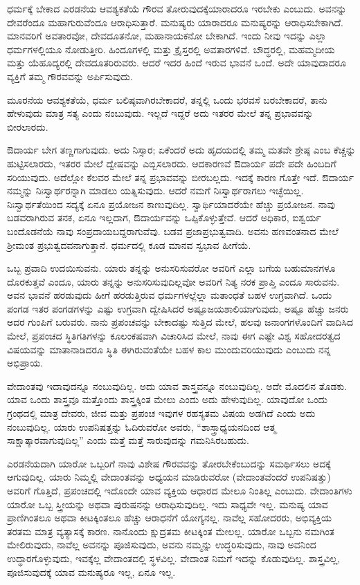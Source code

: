 ಧರ್ಮಕ್ಕೆ ಬೇಕಾದ ಎರಡನೆಯ ಆವಶ್ಯಕತೆಯೆ ಗೌರವ ತೋರುವುದಕ್ಕೆ\break ಯಾರಾದರೂ ಇರಬೇಕು ಎಂಬುದು. ಅವನನ್ನು ದೇವರೆಂದೂ ಮಹಾಗುರುವೆಂದೂ ಆರಾಧಿಸುತ್ತಾರೆ. ಮನುಷ್ಯರು ಯಾರಾದರೂ ಮನುಷ್ಯರನ್ನು ಆರಾಧಿಸಬೇಕಾಗಿದೆ. ಮಾನವರಿಗೆ ಅವತಾರವೋ, ದೇವದೂತನೋ, ಮಹಾನಾಯಕನೋ ಬೇಕಾಗಿದೆ. ಇಂದು ನೀವು ಇದನ್ನು ಎಲ್ಲಾ ಧರ್ಮಗಳಲ್ಲಿಯೂ ನೋಡುತ್ತೀರಿ. ಹಿಂದೂಗಳಲ್ಲಿ ಮತ್ತು ಕ್ರೈಸ್ತರಲ್ಲಿ ಅವತಾರಗಳಿವೆ. ಬೌದ್ಧರಲ್ಲಿ, ಮಹಮ್ಮದೀಯ ಮತ್ತು ಯೆಹೂದ್ಯರಲ್ಲಿ ದೇವದೂತರಿರುವರು. ಆದರೆ ಇದರ ಹಿಂದೆ ಇರುವ ಭಾವನೆ ಒಂದೆ. ಅದೇ ಯಾವುದಾದರೂ ವ್ಯಕ್ತಿಗೆ ತಮ್ಮ ಗೌರವವನ್ನು ಅರ್ಪಿಸುವುದು.

ಮೂರನೆಯ ಆವಶ್ಯಕತೆಯೆ, ಧರ್ಮ ಬಲಿಷ್ಠವಾಗಿರಬೇಕಾದರೆ, ತನ್ನಲ್ಲಿ ಒಂದು ಭರವಸೆ ಬರಬೇಕಾದರೆ, ತಾನು ಹೇಳುವುದು ಮಾತ್ರ ಸತ್ಯ ಎಂದು ನಂಬುವುದು. ಇಲ್ಲದೆ ಇದ್ದರೆ ಅದು ಇತರರ ಮೇಲೆ ತನ್ನ ಪ್ರಭಾವವನ್ನು ಬೀರಲಾರದು.

ಔದಾರ್ಯ ಬೇಗ ತಣ್ಣಗಾಗುವುದು. ಅದು ನಿಸ್ಸಾರ; ಏಕೆಂದರೆ ಅದು ಹೃದಯದಲ್ಲಿ ತಮ್ಮ ಮತವೇ ಶ್ರೇಷ್ಠ ಎಂಬ ಕೆಚ್ಚನ್ನು ಹುಟ್ಟಿಸಲಾರದು, ಇತರರ ಮೇಲೆ ದ್ವೇಷವನ್ನು ಎಬ್ಬಿಸಲಾರದು. ಆದಕಾರಣವೆ ಔದಾರ್ಯ ಪದೇ ಪದೇ ಹಿಂಬದಿಗೆ ಸರಿಯುವುದು. ಅದೆಲ್ಲೋ ಕೆಲವರ ಮೇಲೆ ತನ್ನ ಪ್ರಭಾವವನ್ನು ಬೀರಬಲ್ಲದು. ಇದಕ್ಕೆ ಕಾರಣ ಗೊತ್ತೇ ಇದೆ. ಔದಾರ್ಯ ನಮ್ಮನ್ನು ನಿಃಸ್ವಾರ್ಥರನ್ನಾಗಿ ಮಾಡಲು ಯತ್ನಿಸುವುದು. ಆದರೆ ನಮಗೆ ನಿಃಸ್ವಾರ್ಥರಾಗಲು ಇಚ್ಛೆಯಿಲ್ಲ. ನಿಃಸ್ವಾರ್ಥತೆಯಿಂದ ಸದ್ಯಕ್ಕೆ ಏನೂ ಪ್ರಯೋಜನ ಕಾಣುವುದಿಲ್ಲ. ಸ್ವಾರ್ಥಿಯಾದರೆಯೇ ಹೆಚ್ಚು ಪ್ರಯೋಜನ. ನಾವು ಬಡವರಾಗಿರುವ ತನಕ, ಏನೂ ಇಲ್ಲದಾಗ, ಔದಾರ್ಯವನ್ನು ಒಪ್ಪಿಕೊಳ್ಳುತ್ತೇವೆ. ಆದರೆ ಅಧಿಕಾರ, ಐಶ್ವರ್ಯ ಬಂದೊಡನೆಯೆ ನಾವು ಸಂಪ್ರದಾಯಬದ್ದರಾಗುವೆವು. ಬಡವ ಪ್ರಜಾಪ್ರಭುತ್ವವಾದಿ. ಅವನು ಹಣವಂತನಾದ ಮೇಲೆ ಶ‍್ರೀಮಂತ ಪ್ರಭುತ್ವದವನಾಗುತ್ತಾನೆ. ಧರ್ಮದಲ್ಲಿ ಕೂಡ ಮಾನವ ಸ್ವಭಾವ ಹೀಗೆಯೆ.

ಒಬ್ಬ ಪ್ರವಾದಿ ಉದಯಿಸುವನು. ಯಾರು ತನ್ನನ್ನು ಅನುಸರಿಸುವರೋ ಅವರಿಗೆ ಎಲ್ಲಾ ಬಗೆಯ ಬಹುಮಾನಗಳೂ ದೊರಕುತ್ತವೆ ಎಂದೂ, ಯಾರು ತನ್ನನ್ನು ಅನುಸರಿಸುವುದಿಲ್ಲವೋ ಅವರಿಗೆ ನಿತ್ಯ ನರಕ ಪ್ರಾಪ್ತಿ ಎಂದೂ ಸಾರುವನು. ಅವನ ಭಾವನೆ ಹರಡುವುದು ಹೀಗೆ ಹರಡುತ್ತಿರುವ ಧರ್ಮಗಳಲ್ಲೆಲ್ಲಾ ಮತಾಂಧತೆ ಬಹಳ ಉಗ್ರವಾಗಿದೆ. ಒಂದು ಪಂಗಡ ಇತರ ಪಂಗಡಗಳನ್ನು ಎಷ್ಟು ಉಗ್ರವಾಗಿ ದ್ವೇಷಿಸಿದರೆ ಅಷ್ಟೂ\break ಜಯಶಾಲಿಯಾಗುವುದು, ಅಷ್ಟೂ ಹೆಚ್ಚು ಜನರು ಅದರ ಗುಂಪಿಗೆ ಬರುವರು. ನಾನು ಪ್ರಪಂಚವನ್ನು ಬೇಕಾದಷ್ಟು ಸುತ್ತಿದ ಮೇಲೆ, ಹಲವು ಜನಾಂಗಗಳೊಂದಿಗೆ ವಾದಿಸಿದ ಮೇಲೆ, ಪ್ರಪಂಚದ ಸ್ಥಿತಿಗತಿಗಳನ್ನು ಕೂಲಂಕಷವಾಗಿ ವಿಚಾರಿಸಿದ ಮೇಲೆ, ನಾವು ಈಗ ಎಷ್ಟೇ ವಿಶ್ವ ಸಹೋದರತ್ವದ ವಿಷಯವನ್ನು ಮಾತಾನಾಡಿದರೂ ಸ್ಥಿತಿ ಈಗಿರುವಂತೆಯೇ ಬಹಳ ಕಾಲ ಮುಂದುವರಿಯುವುದು ಎಂಬುದು ನನ್ನ ಅಭಿಪ್ರಾಯ.

ವೇದಾಂತವು ಇದಾವುದನ್ನೂ ನಂಬುವುದಿಲ್ಲ. ಅದು ಯಾವ ಶಾಸ್ತ್ರವನ್ನೂ ನಂಬುವುದಿಲ್ಲ. ಅದೇ ಮೊದಲಿನ ತೊಡಕು. ಯಾವ ಒಂದು ಶಾಸ್ತ್ರವೂ ಮತ್ತೊಂದು ಶಾಸ್ತ್ರಕ್ಕಿಂತ ಮೇಲು ಎಂದು ಅದು ಹೇಳುವುದಿಲ್ಲ. ಯಾವುದೋ ಒಂದು ಗ್ರಂಥದಲ್ಲಿ ಮಾತ್ರ ದೇವರು, ಜೀವ ಮತ್ತು ಪ್ರಪಂಚ ಇವುಗಳ ರಹಸ್ಯತಮ ವಿಷಯ ಅಡಗಿದೆ ಎಂದು ಅದು ನಂಬುವುದಿಲ್ಲ. ಯಾರು ಉಪನಿಷತ್ತನ್ನು ಓದಿರುವರೋ ಅವರು, “ಶಾಸ್ತ್ರಾಧ್ಯಯನದಿಂದ ಆತ್ಮ ಸಾಕ್ಷಾತ್ಕಾರವಾಗುವುದಿಲ್ಲ” ಎಂದು ಮತ್ತೆ ಮತ್ತೆ ಸಾರುವುದನ್ನು ಗಮನಿಸಿರಬಹುದು.

ಎರಡನೆಯದಾಗಿ ಯಾರೋ ಒಬ್ಬರಿಗೆ ನಾವು ವಿಶೇಷ ಗೌರವವನ್ನು ತೋರಬೇಕೆಂಬುದನ್ನು ಸಮರ್ಥಿಸಲು ಅದಕ್ಕೆ ಆಗುವುದಿಲ್ಲ. ಯಾರು ನಿಮ್ಮಲ್ಲಿ ವೇದಾಂತವನ್ನು ಅಧ್ಯಯನ ಮಾಡಿರುವರೋ (ವೇದಾಂತವೆಂದರೆ ಉಪನಿಷತ್ತು) ಅವರಿಗೆ ಗೊತ್ತಿದೆ, ಪ್ರಪಂಚದಲ್ಲಿ ಇದೊಂದೇ ಯಾವ ವ್ಯಕ್ತಿಯ ಆಧಾರದ ಮೇಲೂ ನಿಂತಿಲ್ಲ ಎಂಬುದು. ವೇದಾಂತಿಗಳು ಯಾರೋ ಒಬ್ಬ ಸ್ತ್ರೀಯನ್ನು ಅಥವಾ ಪುರುಷನನ್ನು ಆರಾಧಿಸುವುದಿಲ್ಲ. ಇದು ಸಾಧ್ಯವೇ ಇಲ್ಲ. ಮನುಷ್ಯ ಯಾವ ಪ್ರಾಣಿಗಿಂತಲೂ ಅಥವಾ ಕೀಟಕ್ಕಿಂತಲೂ ಹೆಚ್ಚು ಆರಾಧನೆಗೆ ಯೋಗ್ಯನಲ್ಲ. ನಾವೆಲ್ಲ ಸಹೋದರರು, ಅಭಿವ್ಯಕ್ತಿಯ ತರತಮ ಮಾತ್ರ ವ್ಯತ್ಯಾಸಕ್ಕೆ ಕಾರಣ. ನಾನೊಂದು ಕ್ಷುದ್ರತಮ ಕೀಟಕ್ಕಿಂತ ಮೇಲಲ್ಲ. ಯಾರೋ ಒಬ್ಬನು ನಮಗಿಂತ ಮೇಲಿರುವುದು, ನಾವೆಲ್ಲ ಅವನನ್ನು ಪೂಜಿಸುವುದು, ಅವನು ನಮ್ಮನ್ನು ಉದ್ಧರಿಸುವುದು, ನಾವು ಅವನಿಂದ ಉದ್ಧಾರಗೊಳ್ಳುವುದು, ಇವಕ್ಕೆಲ್ಲ ವೇದಾಂತದಲ್ಲಿ ಸ್ಥಳವಿಲ್ಲ. ವೇದಾಂತ ನಿಮಗೆ ಇದನ್ನು ಕೊಡುವುದಿಲ್ಲ. ಶಾಸ್ತ್ರವಿಲ್ಲ, ಪೂಜಿಸುವುದಕ್ಕೆ ಯಾವ ಮನುಷ್ಯರೂ ಇಲ್ಲ, ಏನೂ ಇಲ್ಲ.

